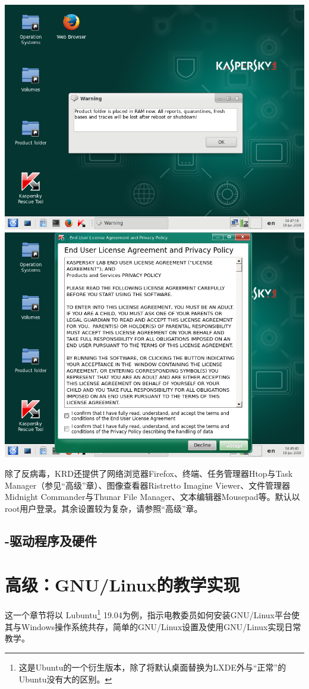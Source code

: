 \documentclass{book}
\begin{document}
\begin{center}
	\includegraphics[scale=0.35]{pic/krd4}	\includegraphics[scale=0.35]{pic/krd5}
\end{center}
除了反病毒，KRD还提供了网络浏览器Firefox、终端、任务管理器Htop与Task Manager（参见“高级”章）、图像查看器Ristretto Imagine Viewer、文件管理器Midnight Commander与Thunar File Manager、文本编辑器Mousepad等。默认以root用户登录。其余设置较为复杂，请参照“高级”章。
\section{-驱动程序及硬件}
\chapter{高级：GNU/Linux的教学实现}
这一个章节将以 Lubuntu\footnote{这是Ubuntu的一个衍生版本，除了将默认桌面替换为LXDE外与“正常”的Ubuntu没有大的区别。} 19.04为例，指示电教委员如何安装GNU/Linux平台使其与Windows操作系统共存，简单的GNU/Linux设置及使用GNU/Linux实现日常教学。\par
\end{document}
